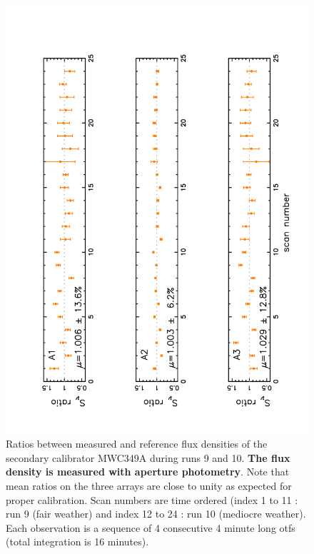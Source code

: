 \begin{figure}[p]
\begin{center}
  \includegraphics[clip, angle=-90, scale=0.6]{Figures/Ratio_vs_index_MWC349_r9_r10_Ap.pdf}
  \caption[Aperture photometry flux density stability checks on secondary calibrators]{Ratios between measured and reference flux densities of  the secondary calibrator  MWC349A
    during runs 9 and 10.  {\bf The flux density is measured with aperture photometry}. Note that mean ratios
    on the three arrays are close to unity as expected for proper calibration.
    Scan numbers are time ordered (index 1 to 11 : run 9 (fair weather) and index 12 to 24 : run 10 (mediocre weather).
    Each observation is a sequence of 4 consecutive 4 minute long otfs (total integration is 16 minutes).
  }
\label{fig:ratio_349_Ap}
\end{center}
\end{figure}



